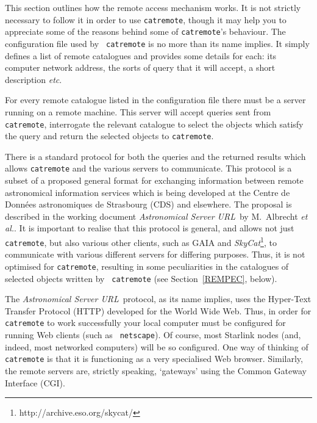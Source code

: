 \documentclass[twoside,11pt]{article}
\newcommand{\htmladdnormallinkfoot}[2]{#1\footnote{#2}}
\newcommand{\xref}[3]{#1}
\renewcommand{\_}{\texttt{\symbol{95}}}
\begin{document}
This section outlines how the remote access mechanism works.  It is
not strictly necessary to follow it in order to use {\tt catremote},
though it may help you to appreciate some of the reasons behind some
of {\tt catremote}'s behaviour.  The configuration file used by {\tt
catremote} is no more than its name implies.  It simply defines a list of
remote catalogues and provides some details for each: its computer network
address, the sorts of query that it will accept, a short description
\emph{etc}.

For every remote catalogue listed in the configuration file there must
be a server running on a remote machine.  This server will accept
queries sent from {\tt catremote}, interrogate the relevant catalogue
to select the objects which satisfy the query and return the selected
objects to {\tt catremote}.

There is a standard protocol for both the queries and the returned
results which allows {\tt catremote} and the various servers to
communicate.  This protocol is a subset of a proposed general format
for exchanging information between remote astronomical information services
which is being developed at the Centre de Donn\'{e}es astronomiques de
Strasbourg (CDS) and elsewhere.  The proposal is described in the
working document {\it Astronomical Server URL}\, by M.~Albrecht {\it et 
al.}\cite{SERVERURL}.  It is important to realise that this protocol 
is general, and allows not just {\tt catremote}, but also various other
clients, such as \xref{GAIA}{sun214}{}\cite{SUN214} and 
\htmladdnormallinkfoot{{\it SkyCat}\/}{http://archive.eso.org/skycat/},
to communicate with various different servers for differing purposes.
Thus, it is not optimised for {\tt catremote}, resulting in some
peculiarities in the catalogues of selected objects written by {\tt
catremote} (see Section~\ref{REMPEC}, below).

The {\it Astronomical Server URL}\, protocol, as its name implies, uses
the Hyper-Text Transfer Protocol (HTTP) developed for the World Wide
Web.  Thus, in order for {\tt catremote} to work successfully your
local computer must be configured for running Web clients (such as {\tt
netscape}).  Of course, most Starlink nodes (and, indeed, most networked
computers) will be so configured.  One way of thinking of {\tt
catremote} is that it is functioning as a very specialised Web browser.
Similarly, the remote servers are, strictly speaking, `gateways'
using the Common Gateway Interface (CGI).
\end{document}

